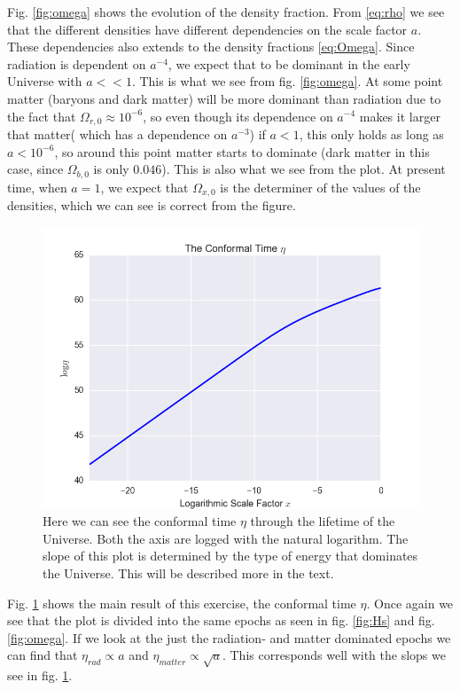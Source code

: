 \documentclass[a4paper,norsk, 10pt]{article}
\begin{document}
Fig. \ref{fig:omega} shows the evolution of the density fraction. From \ref{eq:rho} we see that the different densities have different dependencies on the scale factor $a$. These dependencies also extends to the density fractions \ref{eq:Omega}. Since radiation is dependent on $a^{-4}$, we expect that to be dominant in the early Universe with $a << 1$. This is what we see from fig. \ref{fig:omega}. At some point matter (baryons and dark matter) will be more dominant than radiation due to the fact that $\Omega_{r,0} \approx 10^{-6}$, so even though its dependence on $a^{-4}$ makes it larger that matter( which has a dependence on $a^{-3}$) if $a<1$, this only holds as long as $a < 10^{-6}$, so around this point matter starts to dominate (dark matter in this case, since $\Omega_{b,0}$ is only $0.046$). This is also what we see from the plot. At present time, when $a=1$, we expect that $\Omega_{x,0}$ is the determiner of the values of the densities, which we can see is correct from the figure.


\begin{figure}[H]
     \centering
	{\includegraphics[scale=0.5]{eta.png}
	\caption{Here we can see the conformal time $\eta$ through the lifetime of the Universe. Both the axis are logged with the natural logarithm. The slope of this plot is determined by the type of energy that dominates the Universe. This will be described more in the text. }\label{fig:eta}}
\end{figure}

Fig. \ref{fig:eta} shows the main result of this exercise, the conformal time $\eta$. Once again we see that the plot is divided into the same epochs as seen in fig. \ref{fig:Hs} and fig. \ref{fig:omega}. If we look at the just the radiation- and matter dominated epochs we can find that $\eta_{rad} \propto a$ and $\eta_{matter}\propto \sqrt{a}$. This corresponds well with the slops we see in fig. \ref{fig:eta}.
\end{document}
